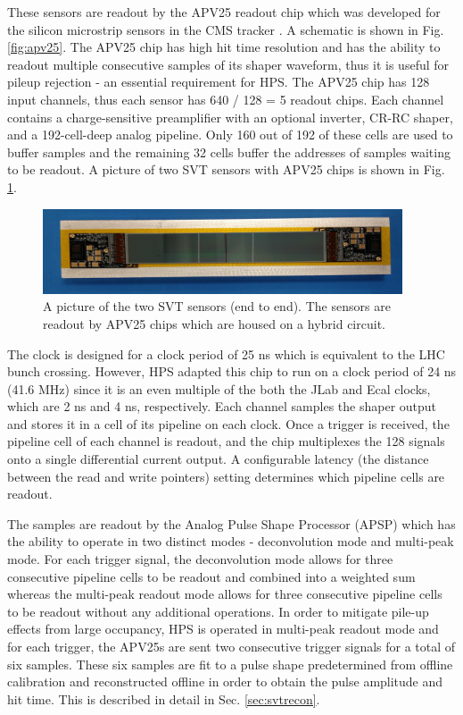 These sensors are readout by the APV25 readout chip which was developed for the silicon microstrip sensors in the CMS tracker \cite{Raymond:2000ey} \cite{French:2001xb}. A schematic is shown in Fig. \ref{fig:apv25}. The APV25 chip has high hit time resolution and has the ability to readout multiple consecutive samples of its shaper waveform, thus it is useful for pileup rejection - an essential requirement for HPS. The APV25 chip has 128 input channels, thus each sensor has 640 / 128 = 5 readout chips. Each channel contains a charge-sensitive preamplifier with an optional inverter, CR-RC shaper, and a 192-cell-deep analog pipeline. Only 160 out of 192 of these cells are used to buffer samples and the remaining 32 cells buffer the addresses of samples waiting to be readout. A picture of two SVT sensors with APV25 chips is shown in Fig. \ref{fig:sensor}.

\begin{figure}
    \centering
    \includegraphics[width=0.95\textwidth]{figs/detector/sensor.png}
    \caption{A picture of the two SVT sensors (end to end). The sensors are readout by APV25 chips which are housed on a hybrid circuit. }
    \label{fig:sensor}
\end{figure}

The clock is designed for a clock period of 25 ns which is equivalent to the LHC bunch crossing. However, HPS adapted this chip to run on a clock period of 24 ns (41.6 MHz) since it is an even multiple of the both the JLab and Ecal clocks, which are 2 ns and 4 ns, respectively. Each channel samples the shaper output and stores it in a cell of its pipeline on each clock. Once a trigger is received, the pipeline cell of each channel is readout, and the chip multiplexes the 128 signals onto a single differential current output. A configurable latency (the distance between the read and write pointers) setting determines which pipeline cells are readout. 

The samples are readout by the Analog Pulse Shape Processor (APSP) which has the ability to operate in two distinct modes - deconvolution mode and multi-peak mode. For each trigger signal, the deconvolution mode allows for three consecutive pipeline cells to be readout and combined into a weighted sum whereas the multi-peak readout mode allows for three consecutive pipeline cells to be readout without any additional operations. In order to mitigate pile-up effects from large occupancy, HPS is operated in multi-peak readout mode and for each trigger, the APV25s are sent two consecutive trigger signals for a total of six samples. These six samples are fit to a pulse shape predetermined from offline calibration and reconstructed offline in order to obtain the pulse amplitude and hit time. This is described in detail in Sec. \ref{sec:svtrecon}.

